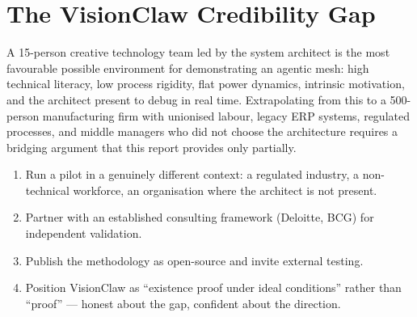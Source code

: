 \section{The VisionClaw Credibility Gap}

A 15-person creative technology team led by the system architect is the most favourable possible environment for demonstrating an agentic mesh: high technical literacy, low process rigidity, flat power dynamics, intrinsic motivation, and the architect present to debug in real time. Extrapolating from this to a 500-person manufacturing firm with unionised labour, legacy ERP systems, regulated processes, and middle managers who did not choose the architecture requires a bridging argument that this report provides only partially.

\begin{keyinsight}[title={Possible Bridging Strategies}]
\begin{enumerate}
  \item Run a pilot in a genuinely different context: a regulated industry, a non-technical workforce, an organisation where the architect is not present.
  \item Partner with an established consulting framework (Deloitte, BCG) for independent validation.
  \item Publish the methodology as open-source and invite external testing.
  \item Position VisionClaw as ``existence proof under ideal conditions'' rather than ``proof'' --- honest about the gap, confident about the direction.
\end{enumerate}
\end{keyinsight}

